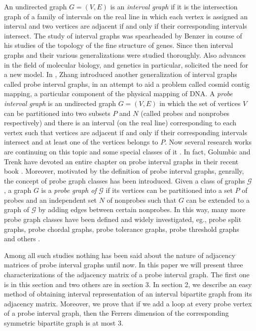 \documentclass[secthm]{elsart}
\begin{document}
An undirected graph $G=(V,E)$ is an {\em{interval graph}} if it is the intersection graph of a family of intervals on the real line in which each vertex is assigned an interval and two vertices are adjacent if and only if their corresponding intervals intersect. The study of interval graphs was spearheaded by Benzer \cite{B} in course of his studies of the topology of the fine structure of genes. Since then interval graphs and their various generalizations were studied thoroughly. Also advances in the field of molecular biology, and genetics in particular, solicited the need for a new model. In \cite{Z}, Zhang introduced another generalization of interval graphs called probe interval graphs, in an attempt to aid a problem called cosmid contig mapping, a particular component of the physical mapping of DNA. A {\em{probe interval graph}} is an undirected graph $G=(V,E)$ in which the set of vertices $V$ can be partitioned into two subsets $P$ and $N$ (called probes and nonprobes respectively) and there is an interval (on the real line) corresponding to each vertex such that vertices are adjacent if and only if their corresponding intervals intersect and at least one of the vertices belongs to $P$. Now several research works are continuing on this topic and some special classes of it \cite{BL,CK,GL,JS,MWZ,LS}. In fact, Golumbic and Trenk have devoted an entire chapter on probe interval graphs in their recent book \cite{GT}. Moreover, motivated by the definition of probe interval graphs, genrally, the concept of probe graph classes has been introduced. Given a class of graphs $\mathscr{G}$, a graph $G$ is a {\em probe graph of} $\mathscr{G}$ if its vertices can be partitioned into a set $P$ of probes and an independent set $N$ of nonprobes such that $G$ can be extended to a graph of $\mathscr{G}$ by adding edges between certain nonprobes. In this way, many more probe graph classes have been defined and widely investigated, eg., probe split graphs, probe chordal graphs, probe tolerance graphs, probe threshold graphs and others \cite{BGL,CKKLP,RB,RLB}.

Among all such studies nothing has been said about the nature of adjacency matrices of probe interval graphs until now. In this paper we will present three characterizations of the adjacency matrix of a probe interval graph. The first one is in this section and two others are in section 3. In section 2, we describe an easy method of obtaining interval representation of an interval bipartite graph from its adjacency matrix. Moreover, we prove that if we add a loop at every probe vertex of a probe interval graph, then the Ferrers dimension of the corresponding symmetric bipartite graph is at most $3$.
\end{document}
